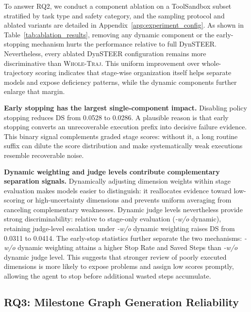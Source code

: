

To answer RQ2, we conduct a component ablation on a ToolSandbox subset stratified by task type and safety category, and the sampling protocol and ablated variants are detailed in Appendix~\ref{app:experiment_config}.
As shown in Table~\ref{tab:ablation_results}, removing any dynamic component or the early-stopping mechanism hurts the performance relative to full DynSTEER. 
Nevertheless, every ablated DynSTEER configuration remains more discriminative than \textsc{Whole-Traj}. 
This uniform improvement over whole-trajectory scoring indicates that stage-wise organization itself helps separate models and expose deficiency patterns, while the dynamic components further enlarge that margin. 

\textbf{Early stopping has the largest single-component impact.} Disabling policy stopping reduces DS from 0.0528 to 0.0286. A plausible reason is that early stopping converts an unrecoverable execution prefix into decisive failure evidence. This binary signal complements graded stage scores: without it, a long routine suffix can dilute the score distribution and make systematically weak executions resemble recoverable noise.

\textbf{Dynamic weighting and judge levels contribute complementary separation signals.} Dynamically adjusting dimension weights within stage evaluation makes models easier to distinguish: it reallocates evidence toward low-scoring or high-uncertainty dimensions and prevents uniform averaging from canceling complementary weaknesses. 
Dynamic judge levels nevertheless provide strong discriminability: relative to stage-only evaluation (\textit{-w/o} dynamic), retaining judge-level escalation under \textit{-w/o} dynamic weighting raises DS from 0.0311 to 0.0414. 
The early-stop statistics further separate the two mechanisms: \textit{-w/o} dynamic weighting attains a higher Stop Rate and Saved Steps than \textit{-w/o} dynamic judge level. This suggests that stronger review of poorly executed dimensions is more likely to expose problems and assign low scores promptly, allowing the agent to stop before additional wasted steps accumulate.

\subsection{RQ3: Milestone Graph Generation Reliability}
\label{sec:exp_rq3}



